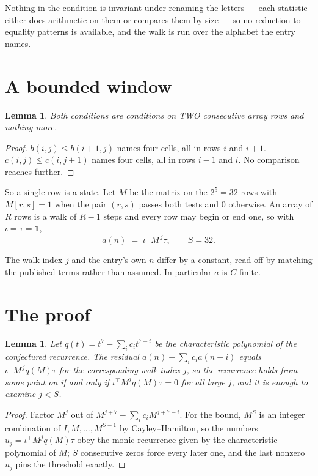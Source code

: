 \documentclass[11pt,a4paper]{article}
\theoremstyle{plain}
\newtheorem{lemma}[theorem]{Lemma}
\theoremstyle{definition}
\begin{document}
Nothing in the condition is invariant under renaming the letters --- each statistic either does
arithmetic on them or compares them by size --- so no reduction to equality patterns is
available, and the walk is run over the alphabet the entry names.

\section{A bounded window}

\begin{lemma}\label{lem:win}
Both conditions are conditions on TWO consecutive array rows and nothing more.
\end{lemma}

\begin{proof}
$b(i,j)\le b(i{+}1,j)$ names four cells, all in rows $i$ and $i+1$. $c(i,j)\le c(i,j{+}1)$
names four cells, all in rows $i-1$ and $i$. No comparison reaches further.
\end{proof}

So a single row is a state. Let $M$ be the matrix on the $2^{5}=32$ rows with
$M[r,s]=1$ when the pair $(r,s)$ passes both tests and $0$ otherwise. An array of $R$ rows is a
walk of $R-1$ steps and every row may begin or end one, so with $\iota=\tau=\mathbf{1}$,
\[
a(n)\;=\;\iota^{\!\top}M^{\,j}\tau ,\qquad S=32.
\]

The walk index $j$ and the entry's own $n$ differ by a constant, read off by matching the
published terms rather than assumed. In particular $a$ is $C$-finite.

\section{The proof}

\begin{lemma}\label{lem:crit}
Let $q(t)=t^{7}-\sum_i c_it^{7-i}$ be the characteristic polynomial of the
conjectured recurrence. The residual $a(n)-\sum_ic_ia(n-i)$ equals
$\iota^{\!\top}M^{\,j}q(M)\tau$ for the corresponding walk index $j$, so the recurrence
holds from some point on if and only if $\iota^{\!\top}M^{j}q(M)\tau=0$ for all large $j$,
and it is enough to examine $j<S$.
\end{lemma}

\begin{proof}
Factor $M^{j}$ out of $M^{j+7}-\sum_ic_iM^{j+7-i}$. For the bound, $M^{S}$
is an integer combination of $I,M,\dots,M^{S-1}$ by Cayley--Hamilton, so the numbers
$u_j=\iota^{\!\top}M^{j}q(M)\tau$ obey the monic recurrence given by the characteristic
polynomial of $M$; $S$ consecutive zeros force every later one, and the last nonzero $u_j$
pins the threshold exactly.
\end{proof}
\end{document}
